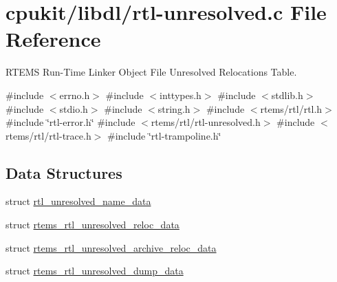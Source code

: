 \hypertarget{rtl-unresolved_8c}{}\section{cpukit/libdl/rtl-\/unresolved.c File Reference}
\label{rtl-unresolved_8c}


R\+T\+E\+MS Run-\/\+Time Linker Object File Unresolved Relocations Table.  


{\ttfamily \#include $<$errno.\+h$>$}\newline
{\ttfamily \#include $<$inttypes.\+h$>$}\newline
{\ttfamily \#include $<$stdlib.\+h$>$}\newline
{\ttfamily \#include $<$stdio.\+h$>$}\newline
{\ttfamily \#include $<$string.\+h$>$}\newline
{\ttfamily \#include $<$rtems/rtl/rtl.\+h$>$}\newline
{\ttfamily \#include \char`\"{}rtl-\/error.\+h\char`\"{}}\newline
{\ttfamily \#include $<$rtems/rtl/rtl-\/unresolved.\+h$>$}\newline
{\ttfamily \#include $<$rtems/rtl/rtl-\/trace.\+h$>$}\newline
{\ttfamily \#include \char`\"{}rtl-\/trampoline.\+h\char`\"{}}\newline
\subsection*{Data Structures}
\begin{DoxyCompactItemize}
\item 
struct \mbox{\hyperlink{structrtl__unresolved__name__data}{rtl\+\_\+unresolved\+\_\+name\+\_\+data}}
\item 
struct \mbox{\hyperlink{structrtems__rtl__unresolved__reloc__data}{rtems\+\_\+rtl\+\_\+unresolved\+\_\+reloc\+\_\+data}}
\item 
struct \mbox{\hyperlink{structrtems__rtl__unresolved__archive__reloc__data}{rtems\+\_\+rtl\+\_\+unresolved\+\_\+archive\+\_\+reloc\+\_\+data}}
\item 
struct \mbox{\hyperlink{structrtems__rtl__unresolved__dump__data}{rtems\+\_\+rtl\+\_\+unresolved\+\_\+dump\+\_\+data}}
\end{DoxyCompactItemize}
